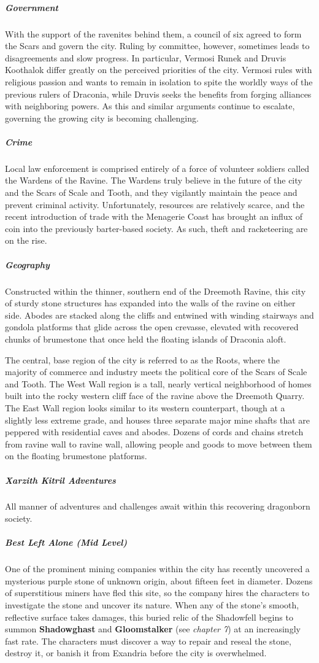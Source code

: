 \documentclass[10pt,a4paper,twoside,bg=print,twocolumn,openany,nodeprecatedcode]{dndbook}
\begin{document}
\subparagraph{Government}
With the support of the ravenites behind them, a council of six agreed to form the Scars and govern the city. Ruling by committee, however, sometimes leads to disagreements and slow progress. In particular, Vermosi Runek and Druvis Koothalok differ greatly on the perceived priorities of the city. Vermosi rules with religious passion and wants to remain in isolation to spite the worldly ways of the previous rulers of Draconia, while Druvis seeks the benefits from forging alliances with neighboring powers. As this and similar arguments continue to escalate, governing the growing city is becoming challenging.

\subparagraph{Crime}
Local law enforcement is comprised entirely of a force of volunteer soldiers called the Wardens of the Ravine. The Wardens truly believe in the future of the city and the Scars of Scale and Tooth, and they vigilantly maintain the peace and prevent criminal activity. Unfortunately, resources are relatively scarce, and the recent introduction of trade with the Menagerie Coast has brought an influx of coin into the previously barter-based society. As such, theft and racketeering are on the rise.

\subparagraph{Geography}
Constructed within the thinner, southern end of the Dreemoth Ravine, this city of sturdy stone structures has expanded into the walls of the ravine on either side. Abodes are stacked along the cliffs and entwined with winding stairways and gondola platforms that glide across the open crevasse, elevated with recovered chunks of brumestone that once held the floating islands of Draconia aloft.

The central, base region of the city is referred to as the Roots, where the majority of commerce and industry meets the political core of the Scars of Scale and Tooth. The West Wall region is a tall, nearly vertical neighborhood of homes built into the rocky western cliff face of the ravine above the Dreemoth Quarry. The East Wall region looks similar to its western counterpart, though at a slightly less extreme grade, and houses three separate major mine shafts that are peppered with residential caves and abodes. Dozens of cords and chains stretch from ravine wall to ravine wall, allowing people and goods to move between them on the floating brumestone platforms.

\subparagraph{Xarzith Kitril Adventures}
All manner of adventures and challenges await within this recovering dragonborn society.

\subparagraph{Best Left Alone (Mid Level)}
 One of the prominent mining companies within the city has recently uncovered a mysterious purple stone of unknown origin, about fifteen feet in diameter. Dozens of superstitious miners have fled this site, so the company hires the characters to investigate the stone and uncover its nature. When any of the stone's smooth, reflective surface takes damages, this buried relic of the Shadowfell begins to summon \textbf{Shadowghast} and \textbf{Gloomstalker} (see \textit{chapter 7}) at an increasingly fast rate. The characters must discover a way to repair and reseal the stone, destroy it, or banish it from Exandria before the city is overwhelmed.
\end{document}
